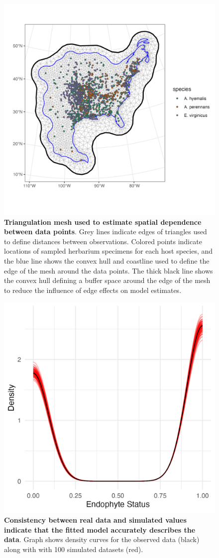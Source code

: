\documentclass[11pt]{article}
\begin{document}
	\begin{figure}[H]
		\centering
		\includegraphics[width = \linewidth]{../Plots/mesh_plot.png}
		\caption{\textbf{Triangulation mesh used to estimate spatial dependence between data points}. Grey lines indicate edges of triangles used to define distances between observations. Colored points indicate locations of sampled herbarium specimens for each host species, and the blue line shows the convex hull and coastline used to define the edge of the mesh around the data points. The thick black line shows the convex hull defining a buffer space around the edge of the mesh to reduce the influence of edge effects on model estimates.}
		\label{fig:meshplot}
	\end{figure}

\begin{figure}[H]
	\centering
	\includegraphics[width = .5\linewidth]{../Plots/overlay_plot.png}
	\caption{\textbf{Consistency between real data and simulated values indicate that the fitted model accurately describes the data}. Graph shows density curves for the observed data (black) along with with 100 simulated datasets (red).}
			\label{fig:overlayplot}
\end{figure}
\end{document}
